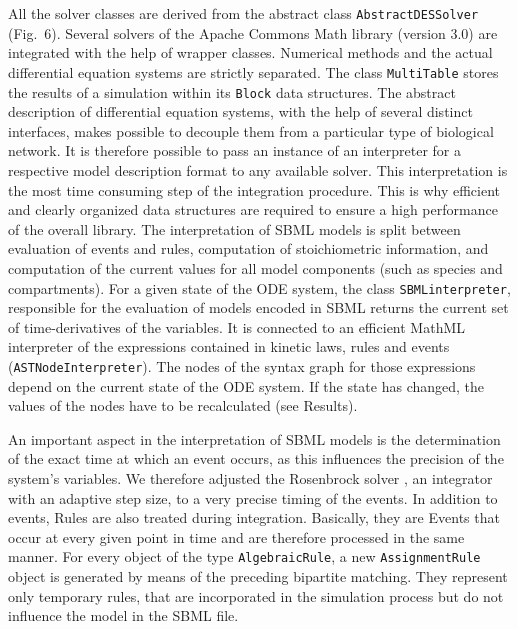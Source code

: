 \documentclass[10pt]{bmc_article}
\newenvironment{bmcformat}{\baselineskip20pt\sloppy\setboolean{publ}{false}}{\baselineskip20pt\sloppy}
\newcommand{\AbstractDESSolver}{\texttt{Abstract\-DES\-Solver}}
\newcommand{\AlgebraicRule}{\texttt{Algebraic\-Rule}}
\newcommand{\AssignmentRule}{\texttt{Assignment\-Rule}}
\newcommand{\SBMLinterpreter}{\texttt{SBML\-interpreter}}
\newcommand{\MultiTable}{\texttt{Multi\-Table}}
\newcommand{\Block}{\texttt{Block}}
\newcommand{\ASTNodeInterpreter}{\texttt{ASTNode\-In\-terpreter}}
\begin{document}
\begin{bmcformat}
All the solver classes are derived from the abstract class \AbstractDESSolver{}
(Fig.~6).
Several solvers of the Apache Commons Math library (version 3.0) are integrated
with the help of wrapper classes. Numerical methods and the actual differential
equation systems are strictly separated. The class \MultiTable{} stores the
results of a simulation within its \Block{} data structures. 
%
The abstract description of differential equation systems, with the help of
several distinct interfaces, makes possible to decouple them from a particular
type of biological network. It is therefore possible to pass an instance of an
interpreter for a respective model description format to any available solver.
%
This interpretation is the most time consuming step of the integration procedure.
This is why efficient and clearly organized data structures are required to
ensure a high performance of the overall library. The interpretation of SBML
models is split between evaluation of events and rules, computation of
stoichiometric information, and computation of the current values for all model
components (such as species and compartments).
%
For a given state of the ODE system, the class \SBMLinterpreter{}, responsible
for the evaluation of models encoded in SBML returns the current set of
time-derivatives of the variables.
It is connected to an efficient MathML interpreter of the expressions contained
in kinetic laws, rules and events (\ASTNodeInterpreter{}). The nodes of the syntax graph for those
expressions depend on the current state of the ODE system. If the state has
changed, the values of the nodes have to be recalculated (see Results).

%
An important aspect in the interpretation of SBML models is the
determination of the exact time at which an event occurs, as this influences
the precision of the system's variables. We therefore adjusted the Rosenbrock
solver \cite{Kotcon2011}, an integrator with an adaptive step size, to a very
precise timing of the events.
%
In addition to events, Rules are also treated during integration. Basically, they are Events that occur at every given point in time and are therefore processed in the same manner. For every object of the type \AlgebraicRule{}, a new \AssignmentRule{} object is generated by means of the preceding bipartite matching. They represent only temporary rules, that are incorporated in the simulation process but do not influence the model in the SBML file.
%


\end{bmcformat}
\end{document}
